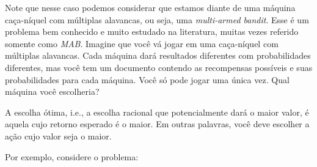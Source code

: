 \documentclass{article}
\begin{document}
            Note que nesse caso podemos considerar que estamos diante de uma máquina caça-níquel com múltiplas alavancas, ou seja, uma \emph{multi-armed bandit}. Esse é um problema bem conhecido e muito estudado na literatura, muitas vezes referido somente como \emph{MAB}. Imagine que você vá jogar em uma caça-níquel com múltiplas alavancas. Cada máquina dará resultados diferentes com probabilidades diferentes, mas você tem um documento contendo as recompensas possíveis e suas probabilidades para cada máquina. Você só pode jogar uma única vez. Qual máquina você escolheria?
        
            A escolha ótima, i.e., a escolha racional que potencialmente dará o maior valor, é aquela cujo retorno esperado é o maior. Em outras palavras, você deve escolher a ação cujo valor seja o maior. 

            Por exemplo, considere o problema:
\end{document}
